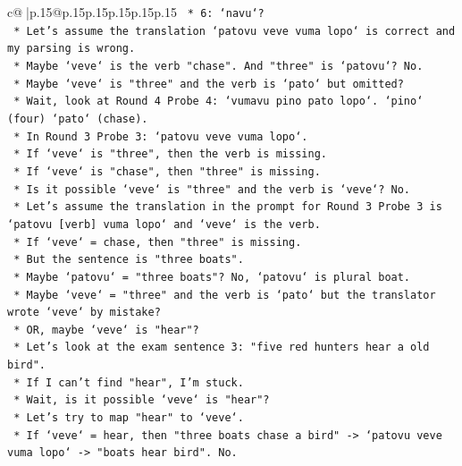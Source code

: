 \documentclass{article}
\begin{document}
{\begin{supertabular}{c@{$\;$}|p{.15\linewidth}@{}p{.15\linewidth}p{.15\linewidth}p{.15\linewidth}p{.15\linewidth}p{.15\linewidth}}
{{{\texttt{                        *   6: `navu`?} \\
\texttt{                        *   Let's assume the translation `patovu veve vuma lopo` is correct and my parsing is wrong.} \\
\texttt{                        *   Maybe `veve` is the verb "chase". And "three" is `patovu`? No.} \\
\texttt{                        *   Maybe `veve` is "three" and the verb is `pato` but omitted?} \\
\texttt{                        *   Wait, look at Round 4 Probe 4: `vumavu pino pato lopo`. `pino` (four) `pato` (chase).} \\
\texttt{                        *   In Round 3 Probe 3: `patovu veve vuma lopo`.} \\
\texttt{                        *   If `veve` is "three", then the verb is missing.} \\
\texttt{                        *   If `veve` is "chase", then "three" is missing.} \\
\texttt{                        *   Is it possible `veve` is "three" and the verb is `veve`? No.} \\
\texttt{                        *   Let's assume the translation in the prompt for Round 3 Probe 3 is `patovu {[}verb{]} vuma lopo` and `veve` is the verb.} \\
\texttt{                        *   If `veve` = chase, then "three" is missing.} \\
\texttt{                        *   But the sentence is "three boats".} \\
\texttt{                        *   Maybe `patovu` = "three boats"? No, `patovu` is plural boat.} \\
\texttt{                        *   Maybe `veve` = "three" and the verb is `pato` but the translator wrote `veve` by mistake?} \\
\texttt{                        *   OR, maybe `veve` is "hear"?} \\
\texttt{                        *   Let's look at the exam sentence 3: "five red hunters hear a old bird".} \\
\texttt{                        *   If I can't find "hear", I'm stuck.} \\
\texttt{                        *   Wait, is it possible `veve` is "hear"?} \\
\texttt{                        *   Let's try to map "hear" to `veve`.} \\
\texttt{                        *   If `veve` = hear, then "three boats chase a bird" {-}> `patovu veve vuma lopo` {-}> "boats hear bird". No.} \\
}}}
\end{supertabular}}
\end{document}
